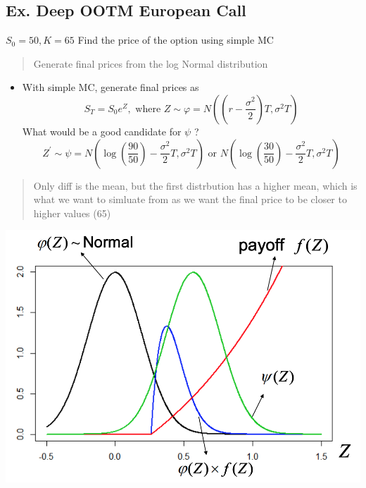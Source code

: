 \documentclass[
  oneside]{book}
\providecommand{\tightlist}{%
  \setlength{\itemsep}{0pt}\setlength{\parskip}{0pt}}
\begin{document}
\hypertarget{ex.-deep-ootm-european-call}{%
\subsection{Ex. Deep OOTM European Call}\label{ex.-deep-ootm-european-call}}

\(S_{0} = 50, K = 65\)
Find the price of the option using simple MC

\begin{quote}
Generate final prices from the log Normal distribution
\end{quote}

\begin{itemize}
\tightlist
\item
  With simple MC, generate final prices as
  \[
  S_T=S_0 e^Z, \text { where } Z \sim \varphi=N\left(\left(r-\frac{\sigma^2}{2}\right) T, \sigma^2 T\right)
  \]
  What would be a good candidate for \(\psi\) ?
  \[
  Z^{\prime} \sim \psi=N\left(\log \left(\frac{90}{50}\right)-\frac{\sigma^2}{2} T, \sigma^2 T\right) \text { or } N\left(\log \left(\frac{30}{50}\right)-\frac{\sigma^2}{2} T, \sigma^2 T\right)
  \]
\end{itemize}

\begin{quote}
Only diff is the mean, but the first distrbution has a higher mean, which is what we want to simluate from as we want the final price to be closer to higher values (65)
\end{quote}

\includegraphics{Notes/Obsidian-Attachments/12-Simulation-Variance-Reduction-4.png}
\end{document}
